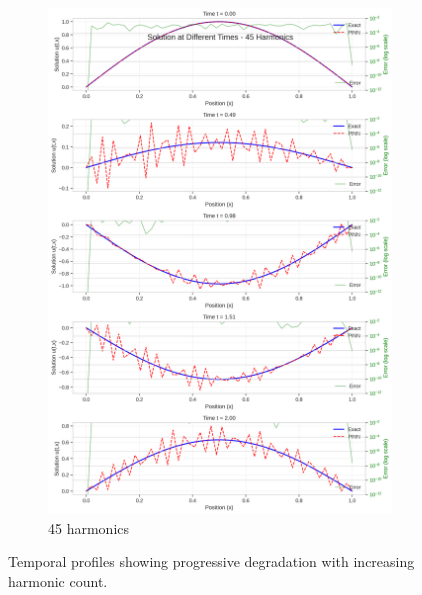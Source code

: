 \begin{figure}[H]
\begin{subfigure}[b]{0.32\textwidth}
        \includegraphics[width=\textwidth]{figures/time_slices_45h.png}
        \caption{45 harmonics}
    \end{subfigure}
    \caption{Temporal profiles showing progressive degradation with increasing harmonic count.}
    \label{fig:time_slices_high}
\end{figure}

